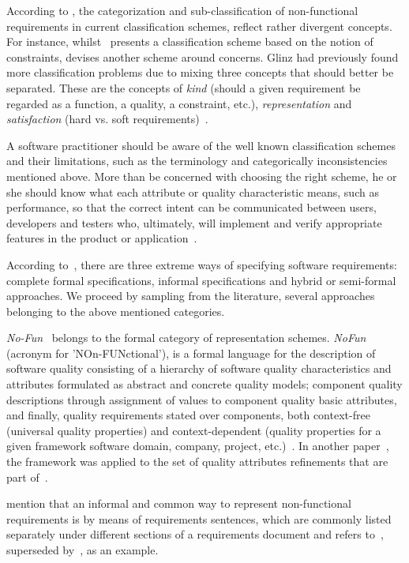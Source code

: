 \documentclass[dissertation,final]{softeng}
\begin{document}
According to \citet{Glinz:2007ehba}, the categorization and sub-classification of non-functional requirements in current classification schemes, reflect rather divergent concepts. For instance, whilst~\citet{Roman:1985} presents a classification scheme based on the notion of constraints, \citet{adams2015non} devises another scheme around concerns. Glinz had previously found more classification problems due to mixing three concepts that should better be separated. These are the concepts of \emph{kind} (should a given requirement be regarded as a function, a quality, a constraint, etc.), \emph{representation} and \emph{satisfaction} (hard vs. soft requirements)~\citep{Glinz:2005unba}.

A software practitioner should be aware of the well known classification schemes and their limitations, such as the terminology and categorically inconsistencies mentioned above. More than be concerned with choosing the right scheme, he or she should know what each attribute or quality characteristic means, such as performance, so that the correct intent can be communicated between users, developers and testers who, ultimately, will implement and verify appropriate features in the product or application~\citep{Chung:2009vg}.

According to~\citet{Matoussi:2008wr}, there are three extreme ways of specifying software requirements: complete formal specifications, informal specifications and hybrid or semi-formal approaches. We proceed by sampling from the literature, several approaches belonging to the above mentioned categories.

\emph{No-Fun}~\citep{Franch1998} belongs to the formal category of representation schemes. \emph{NoFun} (acronym for 'NOn-FUNctional'), is a formal language for the description of software quality consisting of a hierarchy of software quality characteristics and attributes formulated as abstract and concrete quality models; component quality descriptions through assignment of values to component quality basic attributes, and finally, quality requirements stated over components, both context-free (universal quality properties) and context-dependent (quality properties for a given framework software domain, company, project, etc.)~\citep{Franch1998}. In another paper~\cite{NoFunWithISO}, the framework was applied to the set of quality attributes refinements that are part of~\citet{ieee_std_9126One}.

\citet{Chung:2009vg} mention that an informal and common way to represent non-functional requirements is by means of requirements sentences, which are commonly listed separately under different sections of a requirements document and refers to~, superseded by~, as an example.
\end{document}
